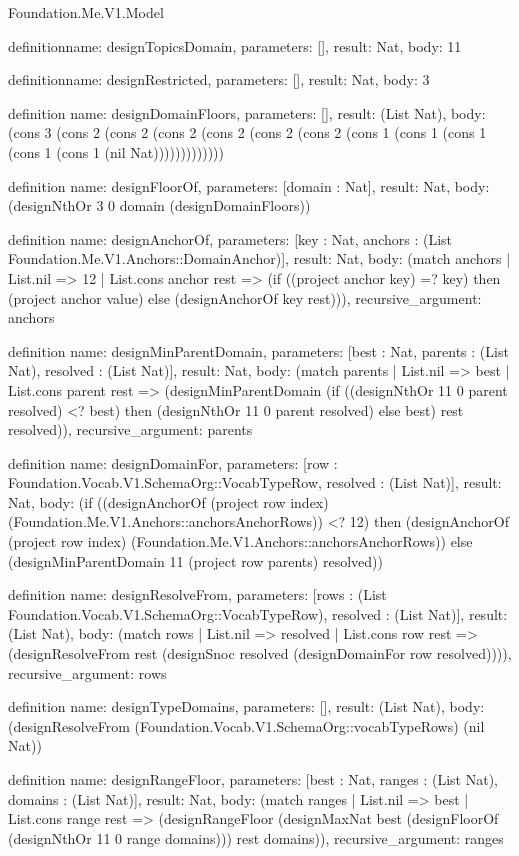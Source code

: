 \begin{lexlean}{Foundation.Me.V1.Model}
\begin{semanticmodule}
definition{name: designTopicsDomain, parameters: [], result: Nat, body: 11}

definition{name: designRestricted, parameters: [], result: Nat, body: 3}

definition{
  name: designDomainFloors,
  parameters: [],
  result: (List Nat),
  body: (cons 3 (cons 2 (cons 2 (cons 2 (cons 2 (cons 2 (cons 2 (cons 1 (cons 1 (cons 1 (cons 1 (cons 1 (nil Nat)))))))))))))
}

definition{
  name: designFloorOf,
  parameters: [domain : Nat],
  result: Nat,
  body: (designNthOr 3 0 domain (designDomainFloors))
}

definition{
  name: designAnchorOf,
  parameters: [key : Nat, anchors : (List Foundation.Me.V1.Anchors::DomainAnchor)],
  result: Nat,
  body: (match anchors
    | List.nil => 12
    | List.cons anchor rest => (if ((project anchor key) =? key) then (project anchor value) else (designAnchorOf key rest))),
  recursive_argument: anchors
}

definition{
  name: designMinParentDomain,
  parameters: [best : Nat, parents : (List Nat), resolved : (List Nat)],
  result: Nat,
  body: (match parents
    | List.nil => best
    | List.cons parent rest => (designMinParentDomain (if ((designNthOr 11 0 parent resolved) <? best) then (designNthOr 11 0 parent resolved) else best) rest resolved)),
  recursive_argument: parents
}

definition{
  name: designDomainFor,
  parameters: [row : Foundation.Vocab.V1.SchemaOrg::VocabTypeRow, resolved : (List Nat)],
  result: Nat,
  body: (if ((designAnchorOf (project row index) (Foundation.Me.V1.Anchors::anchorsAnchorRows)) <? 12) then (designAnchorOf (project row index) (Foundation.Me.V1.Anchors::anchorsAnchorRows)) else (designMinParentDomain 11 (project row parents) resolved))
}

definition{
  name: designResolveFrom,
  parameters: [rows : (List Foundation.Vocab.V1.SchemaOrg::VocabTypeRow), resolved : (List Nat)],
  result: (List Nat),
  body: (match rows
    | List.nil => resolved
    | List.cons row rest => (designResolveFrom rest (designSnoc resolved (designDomainFor row resolved)))),
  recursive_argument: rows
}

definition{
  name: designTypeDomains,
  parameters: [],
  result: (List Nat),
  body: (designResolveFrom (Foundation.Vocab.V1.SchemaOrg::vocabTypeRows) (nil Nat))
}

definition{
  name: designRangeFloor,
  parameters: [best : Nat, ranges : (List Nat), domains : (List Nat)],
  result: Nat,
  body: (match ranges
    | List.nil => best
    | List.cons range rest => (designRangeFloor (designMaxNat best (designFloorOf (designNthOr 11 0 range domains))) rest domains)),
  recursive_argument: ranges
}


\end{semanticmodule}
\end{lexlean}
